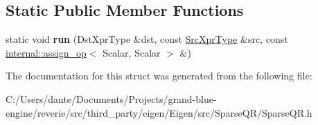 \subsection*{Static Public Member Functions}
\begin{DoxyCompactItemize}
\item 
\mbox{\label{struct_eigen_1_1internal_1_1_assignment_3_01_dst_xpr_type_00_01_sparse_q_r_matrix_q_return_type_aa91d8fc26832a494363cd7146c14303_aa3918307d0e7004de1be35c89ee4a153}} 
static void {\bfseries run} (Dst\+Xpr\+Type \&dst, const \mbox{\hyperlink{struct_eigen_1_1_sparse_q_r_matrix_q_return_type}{Src\+Xpr\+Type}} \&src, const \mbox{\hyperlink{struct_eigen_1_1internal_1_1assign__op}{internal\+::assign\+\_\+op}}$<$ Scalar, Scalar $>$ \&)
\end{DoxyCompactItemize}


The documentation for this struct was generated from the following file\+:\begin{DoxyCompactItemize}
\item 
C\+:/\+Users/dante/\+Documents/\+Projects/grand-\/blue-\/engine/reverie/src/third\+\_\+party/eigen/\+Eigen/src/\+Sparse\+Q\+R/Sparse\+Q\+R.\+h\end{DoxyCompactItemize}
